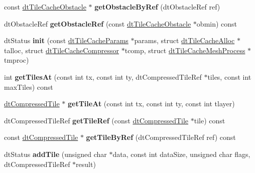 \begin{DoxyCompactItemize}
const \hyperlink{structdtTileCacheObstacle}{dt\+Tile\+Cache\+Obstacle} $\ast$ {\bfseries get\+Obstacle\+By\+Ref} (dt\+Obstacle\+Ref ref)
\item 
\mbox{\label{classdtTileCache_ab8e216fc463a72e59fc9c54df3acc13a}} 
dt\+Obstacle\+Ref {\bfseries get\+Obstacle\+Ref} (const \hyperlink{structdtTileCacheObstacle}{dt\+Tile\+Cache\+Obstacle} $\ast$obmin) const
\item 
\mbox{\label{classdtTileCache_a9cd97203168485f62bf1b2983d56745a}} 
dt\+Status {\bfseries init} (const \hyperlink{structdtTileCacheParams}{dt\+Tile\+Cache\+Params} $\ast$params, struct \hyperlink{structdtTileCacheAlloc}{dt\+Tile\+Cache\+Alloc} $\ast$talloc, struct \hyperlink{structdtTileCacheCompressor}{dt\+Tile\+Cache\+Compressor} $\ast$tcomp, struct \hyperlink{structdtTileCacheMeshProcess}{dt\+Tile\+Cache\+Mesh\+Process} $\ast$tmproc)
\item 
\mbox{\label{classdtTileCache_a4d60dcc8a8395400838cde8f6aa33fc9}} 
int {\bfseries get\+Tiles\+At} (const int tx, const int ty, dt\+Compressed\+Tile\+Ref $\ast$tiles, const int max\+Tiles) const
\item 
\mbox{\label{classdtTileCache_ae13e3a13020a99039b96ccb51ea0dbc2}} 
\hyperlink{structdtCompressedTile}{dt\+Compressed\+Tile} $\ast$ {\bfseries get\+Tile\+At} (const int tx, const int ty, const int tlayer)
\item 
\mbox{\label{classdtTileCache_a3154cf5071666a7cf12495c809255541}} 
dt\+Compressed\+Tile\+Ref {\bfseries get\+Tile\+Ref} (const \hyperlink{structdtCompressedTile}{dt\+Compressed\+Tile} $\ast$tile) const
\item 
\mbox{\label{classdtTileCache_a6d59bed3d3db9550ca4cf9eb17c14b75}} 
const \hyperlink{structdtCompressedTile}{dt\+Compressed\+Tile} $\ast$ {\bfseries get\+Tile\+By\+Ref} (dt\+Compressed\+Tile\+Ref ref) const
\item 
\mbox{\label{classdtTileCache_ace9cbc6f688769c9314d453f5cac2432}} 
dt\+Status {\bfseries add\+Tile} (unsigned char $\ast$data, const int data\+Size, unsigned char flags, dt\+Compressed\+Tile\+Ref $\ast$result)
\item 

\end{DoxyCompactItemize}
